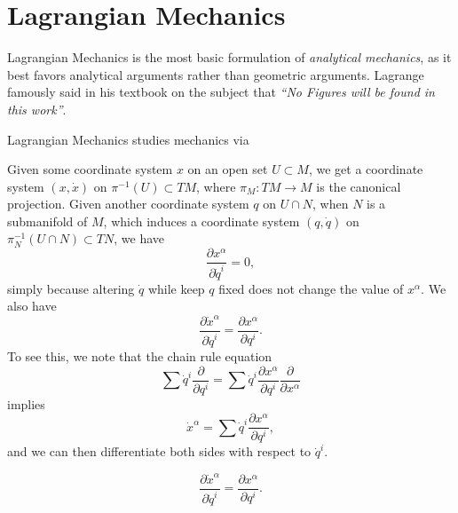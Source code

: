 \chapter{Lagrangian Mechanics}

Lagrangian Mechanics is the most basic formulation of \emph{analytical mechanics}, as it best favors analytical arguments rather than geometric arguments. Lagrange famously said in his textbook on the subject that \emph{``No Figures will be found in this work''}.

Lagrangian Mechanics studies mechanics via

Given some coordinate system $x$ on an open set $U \subset M$, we get a coordinate system $(x,\dot{x})$ on $\pi^{-1}(U) \subset TM$, where $\pi_M: TM \to M$ is the canonical projection. Given another coordinate system $q$ on $U \cap N$, when $N$ is a submanifold of $M$, which induces a coordinate system $(q,\dot{q})$ on $\pi_N^{-1}(U \cap N) \subset TN$, we have
%
\[ \frac{\partial x^\alpha}{\partial \dot{q}^i} = 0, \]
%
simply because altering $\dot{q}$ while keep $q$ fixed does not change the value of $x^\alpha$. We also have
%
\[ \frac{\partial \dot{x}^\alpha}{\partial \dot{q}^i} = \frac{\partial x^\alpha}{\partial q^i}. \]
%
To see this, we note that the chain rule equation
%
\[ \sum \dot{q}^i \frac{\partial}{\partial q^i} = \sum \dot{q}^i \frac{\partial x^\alpha}{\partial q^i} \frac{\partial}{\partial x^\alpha} \]
%
implies
%
\[ \dot{x}^\alpha = \sum \dot{q}^i \frac{\partial x^\alpha}{\partial q^i}, \]
%
and we can then differentiate both sides with respect to $\dot{q}^i$.

%
%
%

%
\[ \frac{\partial \dot{x}^\alpha}{\partial \dot{q}^i} = \frac{\partial x^\alpha}{\partial q^i}. \]
















